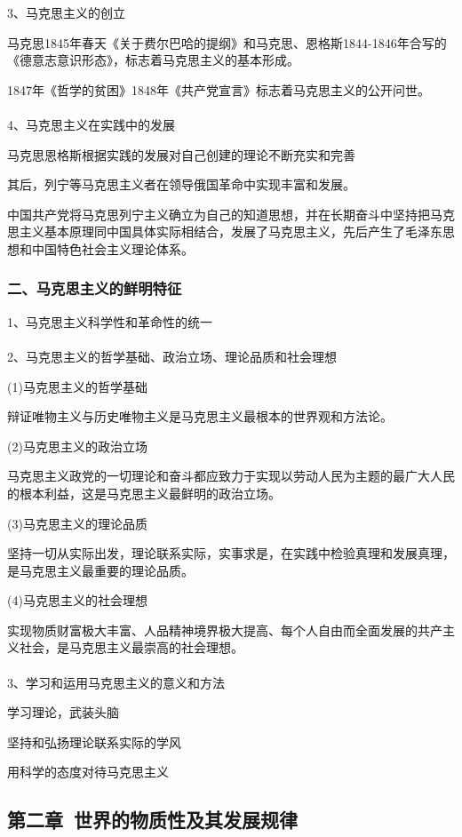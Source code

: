 \documentclass{ctexart}
\begin{document}
3、马克思主义的创立

马克思1845年春天《关于费尔巴哈的提纲》和马克思、恩格斯1844-1846年合写的《德意志意识形态》，标志着马克思主义的基本形成。

1847年《哲学的贫困》1848年《共产党宣言》标志着马克思主义的公开问世。
\\\\

4、马克思主义在实践中的发展

马克思恩格斯根据实践的发展对自己创建的理论不断充实和完善

其后，列宁等马克思主义者在领导俄国革命中实现丰富和发展。

中国共产党将马克思列宁主义确立为自己的知道思想，并在长期奋斗中坚持把马克思主义基本原理同中国具体实际相结合，发展了马克思主义，先后产生了毛泽东思想和中国特色社会主义理论体系。

\subsubsection{二、马克思主义的鲜明特征}
1、马克思主义科学性和革命性的统一
\\\\

2、马克思主义的哲学基础、政治立场、理论品质和社会理想

(1)马克思主义的哲学基础

辩证唯物主义与历史唯物主义是马克思主义最根本的世界观和方法论。

(2)马克思主义的政治立场

马克思主义政党的一切理论和奋斗都应致力于实现以劳动人民为主题的最广大人民的根本利益，这是马克思主义最鲜明的政治立场。

(3)马克思主义的理论品质

坚持一切从实际出发，理论联系实际，实事求是，在实践中检验真理和发展真理，是马克思主义最重要的理论品质。

(4)马克思主义的社会理想

实现物质财富极大丰富、人品精神境界极大提高、每个人自由而全面发展的共产主义社会，是马克思主义最崇高的社会理想。
\\\\

3、学习和运用马克思主义的意义和方法

学习理论，武装头脑

坚持和弘扬理论联系实际的学风

用科学的态度对待马克思主义



\subsection{第二章\ 世界的物质性及其发展规律}
\end{document}
